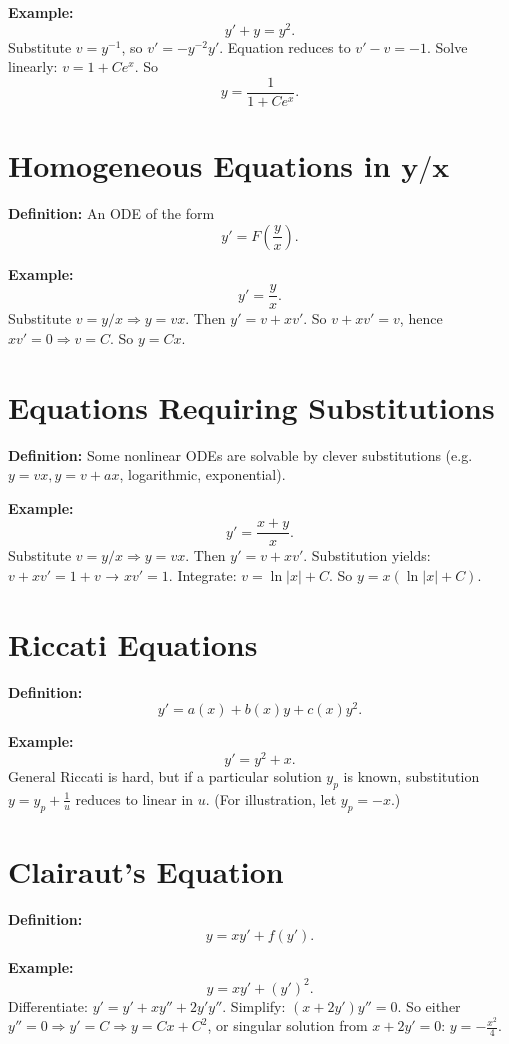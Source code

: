 \documentclass[12pt]{book}
\begin{document}
\textbf{Example:}
\[
y' + y = y^2.
\]
Substitute \(v = y^{-1}\), so \(v' = -y^{-2}y'\). Equation reduces to
\(v' - v = -1\). Solve linearly: \(v = 1 + Ce^x\).  
So
\[
y = \frac{1}{1 + Ce^x}.
\]

\chapter{Homogeneous Equations in \(\mathbf{y/x}\)}
\textbf{Definition:} An ODE of the form
\[
y' = F\!\left(\frac{y}{x}\right).
\]

\textbf{Example:}
\[
y' = \frac{y}{x}.
\]
Substitute \(v = y/x \Rightarrow y = vx\). Then \(y' = v + x v'\). So
\(v + x v' = v\), hence \(xv' = 0 \Rightarrow v=C\).  
So \(y = Cx\).

\chapter{Equations Requiring Substitutions}
\textbf{Definition:} Some nonlinear ODEs are solvable by clever substitutions (e.g. \(y = vx, y=v+ax\), logarithmic, exponential).

\textbf{Example:}
\[
y' = \frac{x+y}{x}.
\]
Substitute \(v = y/x \Rightarrow y = vx\). Then
\(y' = v + x v'\). Substitution yields:  
\(v + xv' = 1+v\) → \(x v' = 1\).  
Integrate: \(v = \ln|x| + C\).  
So \(y = x(\ln|x| + C).\)

\chapter{Riccati Equations}
\textbf{Definition:}
\[
y' = a(x) + b(x)y + c(x)y^2.
\]

\textbf{Example:}
\[
y' = y^2 + x.
\]
General Riccati is hard, but if a particular solution \(y_p\) is known, substitution \(y = y_p + \tfrac{1}{u}\) reduces to linear in \(u\).  
(For illustration, let \(y_p = -x\).)

\chapter{Clairaut’s Equation}
\textbf{Definition:}
\[
y = x y' + f(y').
\]

\textbf{Example:}
\[
y = x y' + (y')^2.
\]
Differentiate: \(y' = y' + x y'' + 2y'y''\). Simplify:
\((x + 2y')y'' = 0\).  
So either \(y''=0 \Rightarrow y' = C \Rightarrow y = Cx + C^2\),  
or singular solution from \(x+2y' = 0\): \(y = -\tfrac{x^2}{4}.\)
\end{document}
